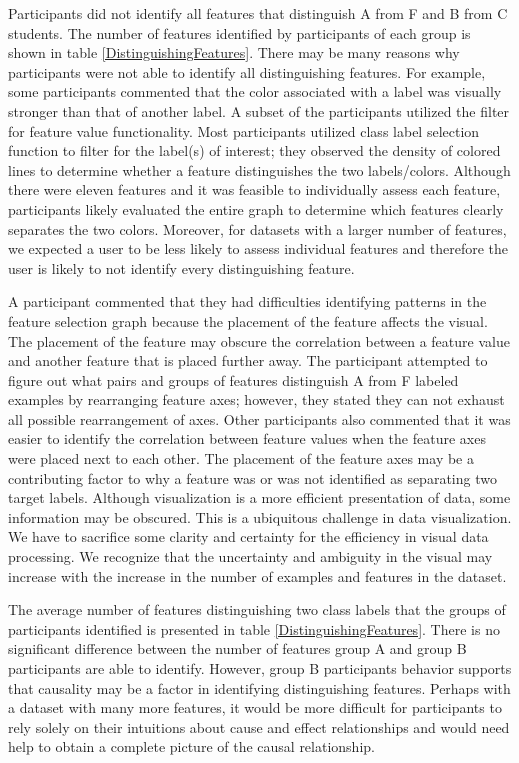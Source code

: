 Participants did not identify all features that distinguish A from F and B from C students. The number of features identified by participants of each group is shown in table \ref{DistinguishingFeatures}. There may be many reasons why participants were not able to identify all distinguishing features. For example, some participants commented that the color associated with a label was visually stronger than that of another label. A subset of the participants utilized the filter for feature value functionality. Most participants utilized class label selection function to filter for the label(s) of interest; they observed the density of colored lines to determine whether a feature distinguishes the two labels/colors. Although there were eleven features and it was feasible to individually assess each feature, participants likely evaluated the entire graph to determine which features clearly separates the two colors. Moreover, for datasets with a larger number of features, we expected a user to be less likely to assess individual features and therefore the user is likely to not identify every distinguishing feature.

A participant commented that they had difficulties identifying patterns in the feature selection graph because the placement of the feature affects the visual. The placement of the feature may obscure the correlation between a feature value and another feature that is placed further away. The participant attempted to figure out what pairs and groups of features distinguish A from F labeled examples by rearranging feature axes; however, they stated they can not exhaust all possible rearrangement of axes. Other participants also commented that it was easier to identify the correlation between feature values when the feature axes were placed next to each other. The placement of the feature axes may be a contributing factor to why a feature was or was not identified as separating two target labels. Although visualization is a more efficient presentation of data, some information may be obscured. This is a ubiquitous challenge in data visualization. We have to sacrifice some clarity and certainty for the efficiency in visual data processing. We recognize that the uncertainty and ambiguity in the visual may increase with the increase in the number of examples and features in the dataset.

The average number of features distinguishing two class labels that the groups of participants identified is presented in table \ref{DistinguishingFeatures}. There is no significant difference between the number of features group A and group B participants are able to identify. However, group B participants behavior supports that causality may be a factor in identifying distinguishing features. Perhaps with a dataset with many more features, it would be more difficult for participants to rely solely on their intuitions about cause and effect relationships and would need help to obtain a complete picture of the causal relationship.

